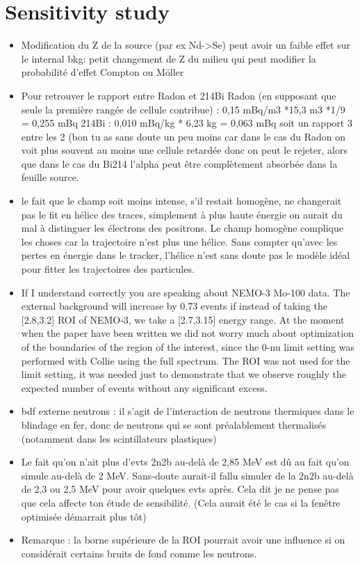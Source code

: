 \documentclass[a4paper,12pt, twoside]{memoir}   	%
\begin{document}
\chapter{Sensitivity study}
\begin{itemize}
\item Modification du Z de la source (par ex Nd->Se) peut avoir un faible effet sur le internal bkg: petit changement de Z du milieu qui peut modifier la probabilité d'effet Compton ou Möller
\item Pour retrouver le rapport entre Radon et 214Bi
Radon (en supposant que seule la première rangée de cellule contribue) : 0,15 mBq/m3 *15,3 m3 *1/9 = 0,255 mBq
214Bi : 0,010 mBq/kg * 6,23  kg = 0,063 mBq
soit un rapport 3 entre les 2 (bon tu as sans doute un peu moins car dans le cas du Radon on voit plus souvent au moins une cellule retardée donc on peut le rejeter, alors que dans le cas du Bi214 l'alpha peut être complètement absorbée dans la feuille source.
\item  le fait que le champ soit moins intense, s'il restait homogène, ne changerait pas le fit en hélice des traces, simplement à plus haute énergie on aurait du mal à distinguer les électrons des positrons.
Le champ homogène complique les choses car la trajectoire n'est plus une hélice.
Sans compter qu'avec les pertes en énergie dans le tracker, l'hélice n'est sans doute pas le modèle idéal pour fitter les trajectoires des particules.
\item If I understand correctly you are speaking about NEMO-3 Mo-100 data.
The external background will increase by 0.73 events if
instead of taking the [2.8,3.2] ROI of NEMO-3, we take a [2.7,3.15] energy range.
At the moment when the paper have been written we did not worry much about
optimization of the boundaries of the region of the interest, since the 0-nu limit
setting was performed with Collie using the full spectrum.
The ROI was not used for the limit setting, it was needed just to demonstrate that
we observe roughly the expected number of events without any significant excess.
\item bdf externe neutrons : il s'agit de l'interaction de neutrons thermiques dans le blindage en fer, donc de neutrons qui se sont préalablement thermalisés (notamment dans les scintillateurs plastiques)
\item Le fait qu'on n'ait plus d'evts 2n2b au-delà de 2,85 MeV est dû au fait qu'on simule au-delà de 2 MeV. Sans-doute aurait-il fallu simuler de la 2n2b au-delà de 2,3 ou 2,5 MeV pour avoir quelques evts après. Cela dit je ne pense pas que cela affecte ton étude de sensibilité. (Cela aurait été le cas si la fenêtre optimisée démarrait plus tôt)
  \item Remarque : la borne supérieure de la ROI pourrait avoir une influence si on considérait certains bruits de fond comme les neutrons.
\end{itemize}
\end{document}
